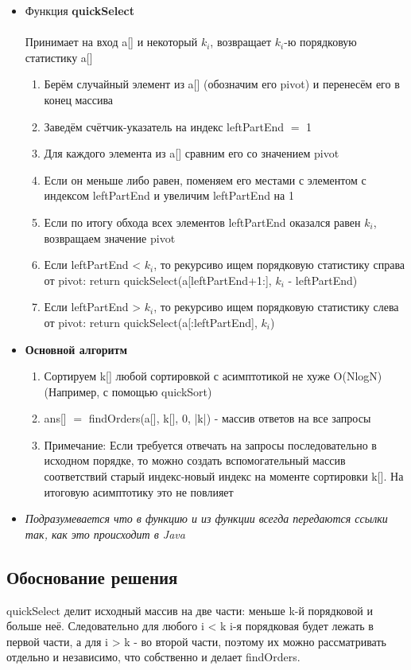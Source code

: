\begin{itemize}
    \item Функция \textbf{quickSelect}\\\\
    Принимает на вход a[] и некоторый $k_i$, возвращает $k_i$-ю порядковую статистику a[]
    \begin{enumerate}
        \item Берём случайный элемент из a[] (обозначим его pivot) и перенесём его в конец массива
        \item Заведём счётчик-указатель на индекс leftPartEnd $=$ 1
        \item Для каждого элемента из a[] сравним его со значением pivot
        \item Если он меньше либо равен, поменяем его местами с элементом с индексом leftPartEnd и увеличим leftPartEnd на 1
        \item Если по итогу обхода всех элементов leftPartEnd оказался равен $k_i$, возвращаем значение pivot
        \item Если leftPartEnd < $k_i$, то рекурсиво ищем порядковую статистику справа от pivot: return quickSelect(a[leftPartEnd+1:], $k_i$ - leftPartEnd)
        \item Если leftPartEnd > $k_i$, то рекурсиво ищем порядковую статистику слева от pivot: return quickSelect(a[:leftPartEnd], $k_i$)
    \end{enumerate}

    \item \textbf{Основной алгоритм}
    \begin{enumerate}
        \item Сортируем k[] любой сортировкой с асимптотикой не хуже O(NlogN) (Например, с помощью quickSort)
        \item ans[] $=$ findOrders(a[], k[], 0, |k|) - массив ответов на все запросы
        \item Примечание: Если требуется отвечать на запросы последовательно в исходном порядке, то можно создать вспомогательный массив соответствий старый индекс-новый индекс на моменте сортировки k[]. На итоговую асимптотику это не повлияет
    \end{enumerate}

    \item \textit{Подразумевается что в функцию и из функции всегда передаются ссылки так, как это происходит в Java}
\end{itemize}

\subsection{Обоснование решения}
quickSelect делит исходный массив на две части: меньше k-й порядковой и больше
неё. Следовательно для любого i < k i-я порядковая будет лежать в первой части, а для i > k - во второй части, поэтому их можно рассматривать отдельно и независимо, что собственно и делает findOrders. 

